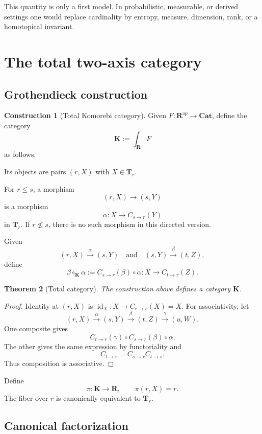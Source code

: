 \documentclass[11pt]{article}
\newtheorem{theorem}{Theorem}[section]
\theoremstyle{definition}
\newtheorem{construction}[theorem]{Construction}
\theoremstyle{remark}
\newcommand{\K}{\mathbf K}
\newcommand{\Rcat}{\mathbf R}
\newcommand{\Tcat}{\mathbf T}
\newcommand{\Cat}{\mathbf{Cat}}
\newcommand{\id}{\operatorname{id}}
\begin{document}
This quantity is only a first model. In probabilistic, measurable, or derived settings one would replace cardinality by entropy, measure, dimension, rank, or a homotopical invariant.

\section{The total two-axis category}

\subsection{Grothendieck construction}

\begin{construction}[Total Komorebi category]\label{cons:groth}
Given $F:\Rcat^{op}\to\Cat$, define the category
\[
\K:=\int_{\Rcat}F
\]
as follows.

Its objects are pairs $(r,X)$ with $X\in\Tcat_r$.

For $r\le s$, a morphism
\[
(r,X)\longrightarrow(s,Y)
\]
is a morphism
\[
\alpha:X\longrightarrow C_{s\to r}(Y)
\]
in $\Tcat_r$. If $r\nleq s$, there is no such morphism in this directed version.
\end{construction}

Given
\[
(r,X)\xrightarrow{\alpha}(s,Y)
\quad\text{and}\quad
(s,Y)\xrightarrow{\beta}(t,Z),
\]
define
\[
\beta\circ_{\K}\alpha
:=
C_{s\to r}(\beta)\circ\alpha:
X\to C_{t\to r}(Z).
\]

\begin{theorem}[Total category]\label{thm:total-category}
The construction above defines a category $\K$.
\end{theorem}

\begin{proof}
Identity at $(r,X)$ is $\id_X:X\to C_{r\to r}(X)=X$. For associativity, let
\[
(r,X)\xrightarrow{\alpha}(s,Y)
\xrightarrow{\beta}(t,Z)
\xrightarrow{\gamma}(u,W).
\]
One composite gives
\[
C_{t\to r}(\gamma)\circ C_{s\to r}(\beta)\circ\alpha.
\]
The other gives the same expression by functoriality and
\[
C_{t\to r}=C_{s\to r}C_{t\to s}.
\]
Thus composition is associative.
\end{proof}

Define
\[
\pi:\K\to\Rcat,
\qquad
\pi(r,X)=r.
\]
The fiber over $r$ is canonically equivalent to $\Tcat_r$.

\subsection{Canonical factorization}
\end{document}
